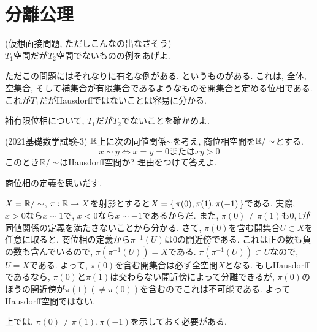 \section{分離公理}
\begin{egprob} (仮想面接問題, ただしこんなの出なさそう)\\
$T_1$空間だが$T_2$空間でないものの例をあげよ.
\end{egprob}
\begin{egans}
ただこの問題にはそれなりに有名な例がある. というものがある. これは, 全体, 空集合, そして補集合が有限集合であるようなものを開集合と定める位相である. これが$T_1
$だがHausdorffではないことは容易に分かる.
\end{egans}
\begin{prac}
補有限位相について, $T_1$だが$T_2$でないことを確かめよ.
\end{prac}

\begin{egprob} (2021基礎数学試験-3) $\mathbb{R}$上に次の同値関係$\sim$を考え, 商位相空間を$\mathbb{R}/\sim$とする.
\[x\sim y \iff x=y=0 または xy > 0\]
このとき$\mathbb{R}/\sim$はHausdorff空間か? 理由をつけて答えよ.
\end{egprob}
\begin{point}
 商位相の定義を思いだす.
\end{point}

\begin{egans}
$X=\mathbb{R}/\sim$, $\pi:\mathbb{R}\to X$を射影とすると$X=\set{\pi(0), \pi(1), \pi(-1)}$である. 実際, $x>0$なら$x\sim 1$で, $x<0$なら$x\sim -1$であるからだ. また, $\pi(0) \neq \pi(1)$も$0,1$が同値関係の定義を満たさないことから分かる.  さて, $\pi(0)$を含む開集合$U\subset X$を任意に取ると, 商位相の定義から$\pi^{-1}(U)$は$0$の開近傍である. これは正の数も負の数も含んでいるので, $\pi(\pi^{-1}(U)) = X$である. $\pi(\pi^{-1}(U))\subset U$なので, $U=X$である. よって, $\pi(0)$を含む開集合は必ず全空間$X$となる. もしHausdorffであるなら, $\pi(0)$と$\pi(1)$は交わらない開近傍によって分離できるが, $\pi(0)$のほうの開近傍が$\pi(1) (\neq \pi(0))$を含むのでこれは不可能である. よってHausdorff空間ではない.
\end{egans}
\begin{rem}上では,
$\pi(0) \neq \pi(1),\pi(-1)$を示しておく必要がある.
\end{rem}





